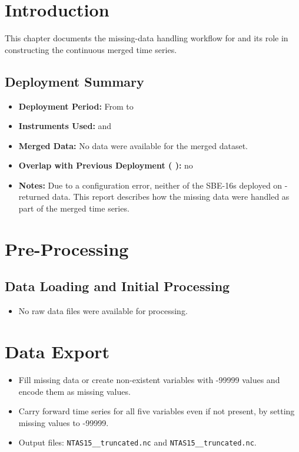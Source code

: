 


\section{Introduction}
This chapter documents the missing-data handling workflow for \projectname{} \casenumber{} and its role in constructing the continuous merged time series.

\subsection{Deployment Summary}
\begin{itemize}
	\item \textbf{Deployment Period:} From \DeploymentStart{} to \DeploymentEnd{}
	\item \textbf{Instruments Used:} \FirstInstrumentType{} \FirstInstrument{} and \SecondInstrumentType{} \SecondInstrument{}
	\item \textbf{Merged Data:} No data were available for the merged dataset.
	\item \textbf{Overlap with Previous Deployment (\projectname{} \previouscasenumber{}):} no
	\item \textbf{Notes:} Due to a configuration error, neither of the SBE-16s deployed on \projectname{}-\casenumber{} returned data. This report describes how the missing data were handled as part of the merged time series.
\end{itemize}

\section{Pre-Processing}
\subsection{Data Loading and Initial Processing}
\begin{itemize}
	\item No raw data files were available for processing.
\end{itemize}

\section{Data Export}
\begin{itemize}
	\item Fill missing data or create non-existent variables with -99999 values and encode them as missing values.
	\item Carry forward time series for all five variables even if not present, by setting missing values to -99999.
	\item Output files:
	\texttt{NTAS15\_\FirstInstrument\_truncated.nc} and \texttt{NTAS15\_\SecondInstrument\_truncated.nc}.
\end{itemize}

